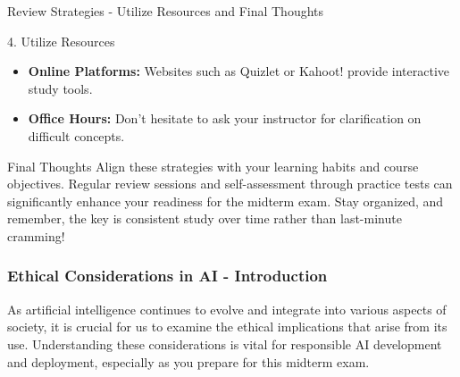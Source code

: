 \documentclass[aspectratio=169]{beamer}
\begin{document}
\begin{frame}[fragile]{Review Strategies - Utilize Resources and Final Thoughts}
    \begin{block}{4. Utilize Resources}
        \begin{itemize}
            \item \textbf{Online Platforms:} Websites such as Quizlet or Kahoot! provide interactive study tools.
            \item \textbf{Office Hours:} Don’t hesitate to ask your instructor for clarification on difficult concepts.
        \end{itemize}
    \end{block}

    \begin{block}{Final Thoughts}
        Align these strategies with your learning habits and course objectives. Regular review sessions and self-assessment through practice tests can significantly enhance your readiness for the midterm exam. Stay organized, and remember, the key is consistent study over time rather than last-minute cramming!
    \end{block}
\end{frame}

\begin{frame}[fragile]
    \frametitle{Ethical Considerations in AI - Introduction}
    As artificial intelligence continues to evolve and integrate into various aspects of society, it is crucial for us to examine the ethical implications that arise from its use. Understanding these considerations is vital for responsible AI development and deployment, especially as you prepare for this midterm exam.
\end{frame}
\end{document}
